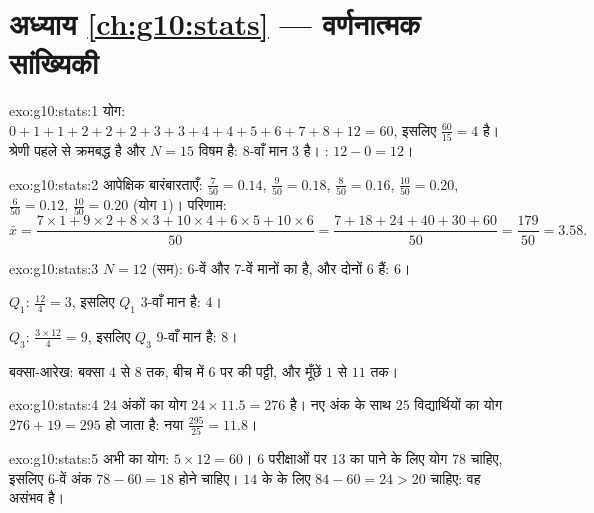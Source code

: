 \section*{अध्याय \ref{ch:g10:stats} --- वर्णनात्मक सांख्यिकी}

\begin{solution}{exo:g10:stats:1}
योग: $0+1+1+2+2+2+3+3+4+4+5+6+7+8+12 = 60$, इसलिए  $\frac{60}{15} = 4$ है। श्रेणी पहले से क्रमबद्ध है और $N = 15$ विषम है:
 $8$-वाँ मान $3$ है। : $12 - 0 = 12$।
\end{solution}

\begin{solution}{exo:g10:stats:2}
आपेक्षिक बारंबारताएँ: $\frac{7}{50} = 0.14$, $\frac{9}{50} = 0.18$, $\frac{8}{50} = 0.16$, $\frac{10}{50} = 0.20$, $\frac{6}{50} = 0.12$, $\frac{10}{50} = 0.20$ (योग $1$)। 
परिणाम:
\[
\bar x = \frac{7 \times 1 + 9 \times 2 + 8 \times 3 + 10 \times 4
+ 6 \times 5 + 10 \times 6}{50}
= \frac{7 + 18 + 24 + 40 + 30 + 60}{50}
= \frac{179}{50} = 3.58 .
\]
\end{solution}

\begin{solution}{exo:g10:stats:3}
$N = 12$ (सम):  $6$-वें और $7$-वें मानों का  है, और दोनों
$6$ हैं:  $6$।

$Q_1$: $\frac{12}{4} = 3$, इसलिए $Q_1$ $3$-वाँ मान है: $4$।

$Q_3$: $\frac{3 \times 12}{4} = 9$, इसलिए $Q_3$ $9$-वाँ मान है: $8$।

बक्सा-आरेख: बक्सा $4$ से $8$ तक, बीच में $6$ पर  की पट्टी, और
मूँछें $1$ से $11$ तक।
\end{solution}

\begin{solution}{exo:g10:stats:4}
$24$ अंकों का योग $24 \times 11.5 = 276$ है। नए अंक के साथ $25$ विद्यार्थियों का योग $276 + 19 = 295$ हो
जाता है: नया  $\frac{295}{25} = 11.8$।
\end{solution}

\begin{solution}{exo:g10:stats:5}
अभी का योग: $5 \times 12 = 60$। $6$ परीक्षाओं पर $13$ का  पाने के लिए योग $78$ चाहिए,
इसलिए $6$-वें अंक $78 - 60 = 18$ होने चाहिए। $14$ के  के लिए $84 - 60 = 24 > 20$ चाहिए: वह
असंभव है।
\end{solution}

